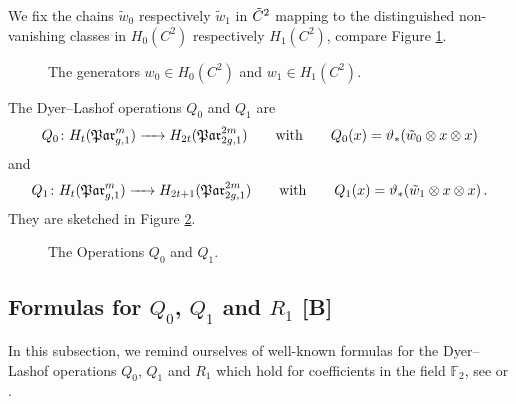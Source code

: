 \begin{defi}
    \label{homology_operations:parallel_patching_slit_pics:generators_w}
    We fix the chains $\tilde w_0$ respectively $\tilde w_1$ in $\cspc 2$ mapping to the distinguished non-vanishing classes in $H_0(C^2)$ respectively $H_1(C^2)$,
    compare Figure \ref{homology_operations:parallel_patching_slit_pics:w_0_and_w_1}.
\end{defi}

\begin{figure}[ht]
    \centering
    \def\svgwidth{.2\columnwidth}
    
    \hspace{3cm}
    \def\svgwidth{.2\columnwidth}
    
    \caption{\label{homology_operations:parallel_patching_slit_pics:w_0_and_w_1}The generators $w_0 \in H_0(C^2)$ and $w_1 \in H_1(C^2)$.}
\end{figure}
\begin{defi}
    \label{homology_operations:parallel_patching_slit_pics:Q_0_and_Q_1}
    The Dyer--Lashof operations $Q_0$ and $Q_1$ are
    \[
        Q_0 \colon H_t( \Par_{g,1}^m ) \to H_{2t}(\Par_{2g,1}^{2m}) \mspc{with}{20} Q_0(x) = \vartheta_\ast( \tilde w_0 \otimes x \otimes x )
    \]
    and
    \[
        Q_1 \colon H_t( \Par_{g,1}^m ) \to H_{2t+1}(\Par_{2g,1}^{2m}) \mspc{with}{20} Q_1(x) = \vartheta_\ast( \tilde w_1 \otimes x \otimes x ) \,.
    \]
    They are sketched in Figure \ref{homology_operations:parallel_patching_slit_pics:w_0_and_w_1_applied}.
\end{defi}
\begin{figure}[ht]
    \centering
    \def\svgwidth{.2\columnwidth}
    
    \hspace{3cm}
    \def\svgwidth{.2\columnwidth}
    
    \caption{\label{homology_operations:parallel_patching_slit_pics:w_0_and_w_1_applied}The Operations $Q_0$ and $Q_1$.}
\end{figure}

\subsection{Formulas for \texorpdfstring{$Q_0$}{Q0}, \texorpdfstring{$Q_1$}{Q1} and \texorpdfstring{$R_1$}{R1} [B]}
In this subsection, we remind ourselves of well-known formulas for the Dyer--Lashof operations $Q_0$, $Q_1$ and $R_1$ which hold for coefficients in the field $\mathbb F_2$,
see \cite[Pages 214--218]{CohenLadaMay1976} or \cite[Sections 4.3--4.5]{Boedigheimer19902}.

